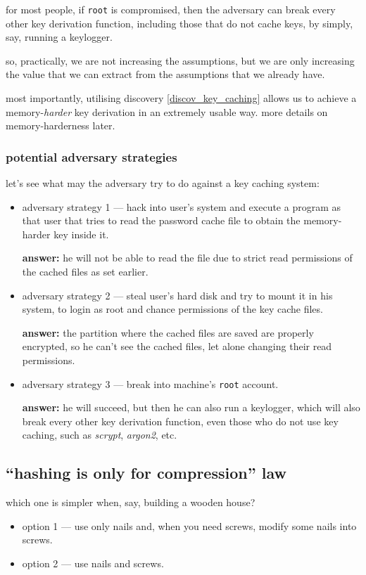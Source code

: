 \documentclass[twocolumn]{article}
\begin{document}
for most people, if \texttt{root} is compromised, then the adversary
can break every other key derivation function, including those that do
not cache keys, by simply, say, running a keylogger.

so, practically, we are not increasing the assumptions, but we are only
increasing the value that we can extract from the assumptions that we
already have.

most importantly, utilising discovery \ref{discov_key_caching} allows us to
achieve a memory-\emph{harder} key derivation in an extremely  usable way.
more details on memory-harderness later.

\subsubsection{potential adversary strategies}
let's see what may the adversary try to do against a key caching system:
\begin{itemize}
    \item adversary strategy 1 --- hack into user's system and execute a
    program as that user that tries to read the password cache file to
    obtain the memory-harder key inside it.

    \textbf{answer:} he will not be able to read the file due to strict
    read permissions of the cached files as set earlier.

    \item adversary strategy 2 --- steal user's hard disk and try to mount
    it in his system, to login as root and chance permissions of the key
    cache files.

    \textbf{answer:} the partition where the cached files are saved are
    properly encrypted, so he can't see the cached files, let alone
    changing their read permissions.

    \item adversary strategy 3 --- break into machine's \texttt{root}
    account.

    \textbf{answer:} he will succeed, but then he can also run a keylogger,
    which will also break every other key derivation function, even those
    who do not use key caching, such as \emph{scrypt}, \emph{argon2}, etc.
\end{itemize}

\subsection{``hashing is only for compression'' law}
which one is simpler when, say, building a wooden house?
\begin{itemize}
    \item option 1 --- use only nails and, when you need screws,
    modify some nails into screws.
    \item option 2 --- use nails and screws.
\end{itemize}
\end{document}
